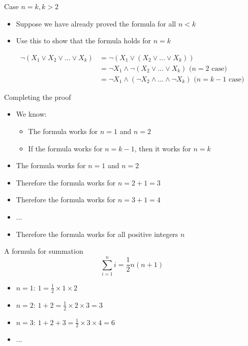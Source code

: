 \begin{frame}{Case $n = k, k > 2$}
    \begin{itemize}
        \pause\item Suppose we have already proved the formula for all $n < k$
        \pause\item Use this to show that the formula holds for $n = k$
    \end{itemize}
    \pause
    \begin{align*}
        \neg (X_1 \vee X_2 \vee \dots \vee X_k) &= \neg (X_1 \vee (X_2 \vee \dots \vee X_k)) \\ 
            &= \neg X_1 \wedge \neg (X_2 \vee \dots \vee X_k) \text{ ($n=2$ case)} \\ 
            &= \neg X_1 \wedge (\neg X_2 \wedge \dots \wedge \neg X_k) \text{ ($n=k-1$ case)}
    \end{align*}
\end{frame}

\begin{frame}{Completing the proof}
    \begin{itemize}
        \pause\item We know:
            \begin{itemize}
                \pause\item The formula works for $n=1$ and $n=2$
                \pause\item If the formula works for $n=k-1$, then it works for $n=k$
            \end{itemize}
        \pause\item The formula works for $n=1$ and $n=2$
        \pause\item Therefore the formula works for $n=2+1=3$
        \pause\item Therefore the formula works for $n=3+1=4$
        \pause\item ...
        \pause\item Therefore the formula works for all positive integers $n$
    \end{itemize}
\end{frame}

\begin{frame}{A formula for summation}
$$ \sum_{i=1}^n i = \frac12 n (n+1) $$
\pause
\begin{itemize}
	\pause\item $n=1$: $1 = \frac12 \times 1 \times 2$
	\pause\item $n=2$: $1+2 = \frac12 \times 2 \times 3 = 3$
	\pause\item $n=3$: $1+2+3 = \frac12 \times 3 \times 4 = 6$
	\pause\item ...
\end{itemize}
\end{frame}

